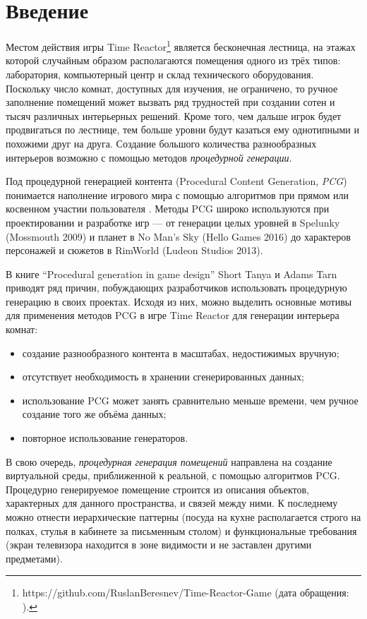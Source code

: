 
\section{Введение}
\thispagestyle{withCompileDate}

Местом действия игры Time Reactor\footnote{https://github.com/RuslanBeresnev/Time-Reactor-Game (дата обращения: ).} является бесконечная лестница, на этажах которой случайным образом располагаются помещения одного из трёх типов: лаборатория, компьютерный центр и склад технического оборудования.
Поскольку число комнат, доступных для изучения, не ограничено, то ручное заполнение помещений может вызвать ряд трудностей при создании сотен и тысяч различных интерьерных решений. Кроме того, чем дальше игрок будет продвигаться по лестнице, тем больше уровни будут казаться ему однотипными и похожими друг на друга. Создание большого количества разнообразных интерьеров возможно с помощью методов \textit{процедурной генерации}.

Под процедурной генерацией контента (Procedural Content Ge\-ne\-ra\-ti\-on, \textit{PCG}) понимается наполнение игрового мира с помощью алгоритмов при прямом или косвенном участии пользователя \cite{article}. Методы PCG широко используются при проектировании и разработке игр \cite{dahren2021usage} --- от генерации целых уровней в Spelunky (Mossmouth 2009) и планет
в No Man’s Sky (Hello Games 2016) до характеров персонажей и сюжетов в RimWorld (Ludeon Studios 2013). 

В книге \enquote{Procedural generation in game design} Short Tanya и Adams Tarn приводят ряд причин, побуждающих разработчиков использовать процедурную генерацию в своих проектах. Исходя из них, можно выделить основные мотивы для применения методов PCG в игре Time Reactor для генерации интерьера комнат:
\begin{itemize}
    \item создание разнообразного контента в масштабах, недостижимых вручную;
    \item отсутствует необходимость в хранении сгенерированных данных;
    \item использование PCG может занять сравнительно меньше времени, чем ручное создание того же объёма данных;
    \item повторное использование генераторов.
\end{itemize}

В свою очередь, \textit{процедурная генерация помещений} направлена на создание виртуальной среды, приближенной к реальной, с помощью алгоритмов PCG. Процедурно генерируемое помещение строится из описания объектов, характерных для данного пространства, и связей между ними. К последнему можно отнести иерархические паттерны (посуда на кухне располагается строго на полках, стулья в кабинете за письменным столом) и функциональные требования (экран телевизора находится в зоне видимости и не заставлен другими предметами). 

